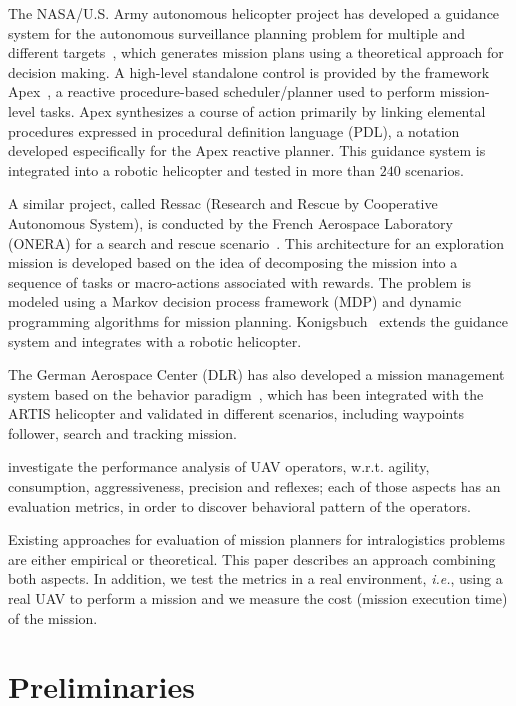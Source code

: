 \documentclass[conference,harvard,brazil,english]{sbatex}
\begin{document}
The NASA/U.S. Army autonomous helicopter project has developed a guidance system for the autonomous surveillance planning problem for multiple and different targets~\cite{whalley2005design}, which generates mission plans using a theoretical approach for decision making. A high-level standalone control is provided by the framework Apex~\cite{baer1998nasa}, a reactive procedure-based scheduler/planner used to perform mission-level tasks. Apex synthesizes a course of action primarily by linking elemental procedures expressed in procedural definition language (PDL), a notation developed especifically for the Apex reactive planner. This guidance system is integrated into a robotic helicopter and tested in more than $240$ scenarios.

A similar project, called Ressac (Research and Rescue by Cooperative Autonomous System), is conducted by the French Aerospace Laboratory (ONERA) for a search and rescue scenario~\cite{fabiani2007autonomous}. This architecture for an exploration mission is developed based on the idea of decomposing the mission into a sequence of tasks or macro-actions associated with rewards. The problem is modeled using a Markov decision process framework (MDP) and dynamic programming algorithms for mission planning. Konigsbuch~\cite{teichteil2007multi} extends the guidance system and integrates with a robotic helicopter.

The German Aerospace Center (DLR) has also developed a mission management system based on the behavior paradigm~\cite{adolf2010onboard}, which has been integrated with the ARTIS helicopter and validated in different scenarios, including waypoints follower, search and tracking mission.

 investigate the performance analysis of UAV operators, w.r.t. agility, consumption, aggressiveness, precision and reflexes; each of those aspects has an evaluation metrics, in order to discover behavioral pattern of the operators.

Existing approaches for evaluation of mission planners for intralogistics problems are either empirical or theoretical. This paper describes an approach combining both aspects. In addition, we test the metrics in a real environment, \textit{i.e.}, using a real UAV to perform a mission and we measure the cost (mission execution time) of the mission.

\section{Preliminaries}
\label{sec:background}
\end{document}
